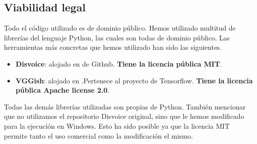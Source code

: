 \subsection{Viabilidad legal}
Todo el código utilizado es de dominio público. Hemos utilizado multitud de librerías del lenguaje Python, las cuales son todas de dominio público. Las herramientas más concretas que hemos utilizado han sido las siguientes.
\begin{itemize}
\item \textbf{Disvoice}: alojado en  de Github. \textbf{Tiene la licencia pública MIT}.
\item \textbf{VGGish}: alojado en .Pertenece al proyecto de Tensorflow. \textbf{Tiene la licencia pública Apache license 2.0}.
\end{itemize}
Todas las demás librerías utilizadas son propias de Python. También mencionar que no utilizamos el repositorio Disvoice original, sino que le hemos modificado para la ejecución en Windows. Esto ha sido posible ya que la licencia MIT permite tanto el uso comercial como la modificación el mismo.

